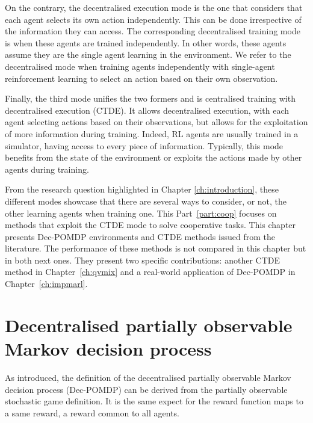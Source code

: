 On the contrary, the decentralised execution mode is the one that considers that each agent selects its own action independently.
This can be done irrespective of the information they can access.
The corresponding decentralised training mode is when these agents are trained independently.
In other words, these agents assume they are the single agent learning in the environment.
We refer to the decentralised mode when training agents independently with single-agent reinforcement learning to select an action based on their own observation.

Finally, the third mode unifies the two formers and is centralised training with decentralised execution (CTDE).
It allows decentralised execution, with each agent selecting actions based on their observations, but allows for the exploitation of more information during training.
Indeed, RL agents are usually trained in a simulator, having access to every piece of information.
Typically, this mode benefits from the state of the environment or exploits the actions made by other agents during training.

From the research question highlighted in Chapter \ref{ch:introduction}, these different modes showcase that there are several ways to consider, or not, the other learning agents when training one.
This Part~\ref{part:coop} focuses on methods that exploit the CTDE mode to solve cooperative tasks.
This chapter presents Dec-POMDP environments and CTDE methods issued from the literature.
The performance of these methods is not compared in this chapter but in both next ones.
They present two specific contributions: another CTDE method in Chapter~\ref{ch:qvmix} and a real-world application of Dec-POMDP in Chapter~\ref{ch:impmarl}.

\section{Decentralised partially observable Markov decision process}
\label{sec:ch3_decpomdp}
As introduced, the definition of the decentralised partially observable Markov decision process (Dec-POMDP) \citep{DecPomdp} can be derived from the partially observable stochastic game definition.
It is the same expect for the reward function maps to a same reward, a reward common to all agents.

